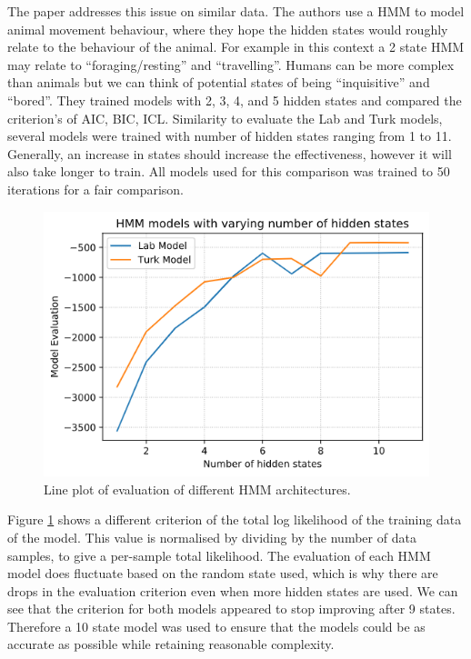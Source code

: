 \documentclass{article}
\begin{document}
The paper \cite{pohle2017selecting} addresses this issue on similar data.
The authors use a HMM to model animal movement behaviour, where they hope the hidden states would roughly relate to the behaviour of the animal.
For example in this context a 2 state HMM may relate to ``foraging/resting'' and ``travelling''.
Humans can be more complex than animals but we can think of potential states of being ``inquisitive'' and ``bored''.
They trained models with 2, 3, 4, and 5 hidden states and compared the criterion's of AIC, BIC, ICL.
Similarity to evaluate the Lab and Turk models, several models were trained with number of hidden states ranging from 1 to 11.
Generally, an increase in states should increase the effectiveness, however it will also take longer to train.
All models used for this comparison was trained to 50 iterations for a fair comparison. 

\begin{figure}[ht]
    \centering
    \includegraphics[scale=0.55]{Images/ModelEvaluation.png}
    \caption{Line plot of evaluation of different HMM architectures.}
    \label{fig:ModleEval}
\end{figure}

Figure \ref{fig:ModleEval} shows a different criterion of the total log likelihood of the training data of the model.
This value is normalised by dividing by the number of data samples, to give a per-sample total likelihood.
The evaluation of each HMM model does fluctuate based on the random state used, which is why there are drops in the evaluation criterion even when more hidden states are used.
We can see that the criterion for both models appeared to stop improving after 9 states.
Therefore a 10 state model was used to ensure that the models could be as accurate as possible while retaining reasonable complexity.
\end{document}
